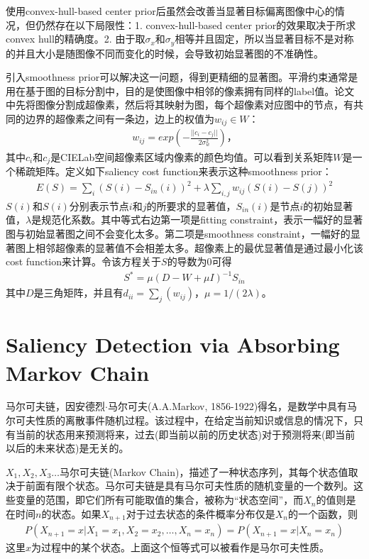 \documentclass[12pt]{article}
\begin{document}
使用convex-hull-based center prior后虽然会改善当显著目标偏离图像中心的情况，但仍然存在以下局限性：1. convex-hull-based center prior的效果取决于所求convex hull的精确度。2. 由于取$\sigma_x$和$\sigma_y$相等并且固定，所以当显著目标不是对称的并且大小是随图像不同而变化的时候，会导致初始显著图的不准确性。

引入smoothness prior可以解决这一问题，得到更精细的显著图。平滑约束通常是用在基于图的目标分割中，目的是使图像中相邻的像素拥有同样的label值。论文中先将图像分割成超像素，然后将其映射为图，每个超像素对应图中的节点，有共同的边界的超像素之间有一条边，边上的权值为$w_{ij} \in W$：
\begin{align}
w_{ij} = exp\left(-\frac{||c_i-c_j||}{2\sigma_w^2}\right)，
\end{align}
其中$c_i$和$c_j$是CIELab空间超像素区域内像素的颜色均值。可以看到关系矩阵$W$是一个稀疏矩阵。定义如下saliency cost function来表示这种smoothness prior：
\begin{align}
E(S) = \sum_i(S(i)-S_{in}(i))^2+\lambda\sum_{i,j}w_{ij}(S(i)-S(j))^2
\end{align}
$S(i)$和$S(i)$分别表示节点$i$和$j$的所要求的显著值，$S_{in}(i)$是节点$i$的初始显著值，$\lambda$是规范化系数。其中等式右边第一项是fitting constraint，表示一幅好的显著图与初始显著图之间不会变化太多。第二项是smoothness constraint，一幅好的显著图上相邻超像素的显著值不会相差太多。超像素上的最优显著值是通过最小化该cost function来计算。令该方程关于$S$的导数为0可得
\begin{align}
S^* = \mu (D-W+\mu I)^{-1}S_{in}
\end{align}
其中$D$是三角矩阵，并且有$d_{ii} = \sum_j (w_{ij})$，$\mu = 1/(2\lambda)$。

\section{Saliency Detection via Absorbing Markov Chain}

马尔可夫链，因安德烈$\cdot$马尔可夫(A.A.Markov, 1856-1922)得名，是数学中具有马尔可夫性质的离散事件随机过程。该过程中，在给定当前知识或信息的情况下，只有当前的状态用来预测将来，过去(即当前以前的历史状态)对于预测将来(即当前以后的未来状态)是无关的。

$X_1, X_2, X_3\ldots$马尔可夫链(Markov Chain)，描述了一种状态序列，其每个状态值取决于前面有限个状态。马尔可夫链是具有马尔可夫性质的随机变量的一个数列。这些变量的范围，即它们所有可能取值的集合，被称为“状态空间”，而$X_n$的值则是在时间$n$的状态。如果$X_{n+1}$对于过去状态的条件概率分布仅是$X_n$的一个函数，则
\begin{align}
P(X_{n+1}=x|X_1=x_1, X_2=x_2, \ldots, X_n=x_n)=P(X_{n+1}=x|X_n=x_n)
\end{align}
这里$x$为过程中的某个状态。上面这个恒等式可以被看作是马尔可夫性质。
\end{document}
